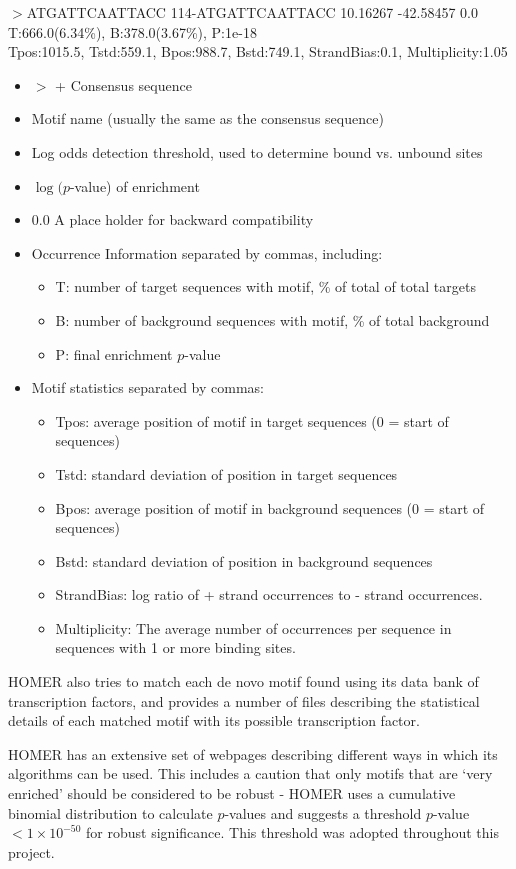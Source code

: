 \documentclass[12pt]{article}
\begin{document}
$>$ATGATTCAATTACC	114-ATGATTCAATTACC	
10.16267	-42.58457	0.0\\	T:666.0(6.34\%), B:378.0(3.67\%), P:1e-18\\ Tpos:1015.5, Tstd:559.1, Bpos:988.7, Bstd:749.1, StrandBias:0.1, Multiplicity:1.05
\begin{itemize}
\item $>$ + Consensus sequence 
\item Motif name (usually the same as the consensus sequence)
\item Log odds detection threshold, used to determine bound vs. unbound sites 
\item $\log(p$-value) of enrichment
\item 0.0  A place holder for backward compatibility
\item Occurrence Information separated by commas, including:
\begin{itemize}
\item T: number of target sequences with motif, \% of total of total targets
\item B: number of background sequences with motif, \% of total background
\item P: final enrichment $p$-value
\end{itemize}
\item Motif statistics separated by commas: 
\begin{itemize}
\item Tpos: average position of motif in target sequences (0 = start of sequences)
\item Tstd: standard deviation of position in target sequences
\item Bpos: average position of motif in background sequences (0 = start of sequences)
\item Bstd: standard deviation of position in background sequences
\item StrandBias: log ratio of + strand occurrences to - strand occurrences.
\item Multiplicity: The average number of occurrences per sequence in sequences with 1 or more binding sites.
\end{itemize}
\end{itemize}

HOMER also tries to match each de novo motif found using its data bank of transcription factors, and provides a number of files describing the statistical details of each matched motif with its possible transcription factor.

HOMER has an extensive set of webpages describing different ways in which its algorithms can be used. This includes a caution that only motifs that are `very enriched' should be considered to be robust - HOMER uses a cumulative binomial distribution to calculate $p$-values and suggests a threshold $p$-value $ <1\times10^{-50}$ for robust significance. This threshold was adopted throughout this project. 
\end{document}
